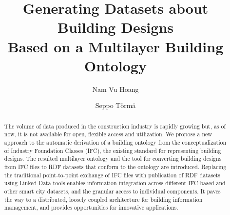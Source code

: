 \documentclass[envcountsame]{llncs}
\begin{document}
%
\frontmatter          %
%
\pagestyle{headings}  %
%


%
\title{Generating Datasets about Building Designs \\Based on a Multilayer Building Ontology}
%
%
\author{Nam Vu Hoang \and Seppo T\"orm\"a}
%
%

\maketitle              %

\begin{abstract}

The volume of data produced in the construction industry is rapidly growing but, as of now, it is not available for open, flexible access and utilization. We propose a new approach to the automatic derivation of a building ontology from the conceptualization of Industry Foundation Classes (IFC), the existing standard for representing building designs. The resulted multilayer ontology and the tool for converting building designs from IFC files to RDF datasets that conform to the ontology are introduced. Replacing the traditional point-to-point exchange of IFC files with publication of RDF datasets using Linked Data tools enables information integration across different IFC-based and other smart city datasets, and the granular access to individual components. It paves the way to a distributed, loosely coupled architecture for building information management, and provides opportunities for innovative applications. 


\end{abstract}





\end{document}
